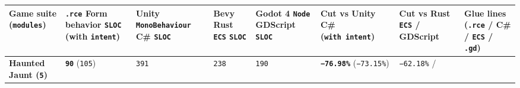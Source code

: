 \documentclass[10pt,letterpaper]{article}
\begin{document}
{\scriptsize\setlength{\tabcolsep}{2.4pt}\renewcommand{\arraystretch}{1.12}
\begin{longtable}[]{@{}
  >{\raggedright\arraybackslash}p{}
  >{\raggedleft\arraybackslash}p{}
  >{\raggedleft\arraybackslash}p{}
  >{\raggedleft\arraybackslash}p{}
  >{\raggedleft\arraybackslash}p{}
  >{\raggedleft\arraybackslash}p{}
  >{\raggedleft\arraybackslash}p{}
  >{\raggedleft\arraybackslash}p{}@{}}
\toprule\noalign{}
\begin{minipage}[b]{\linewidth}\raggedright
\textbf{Game suite (\texttt{modules})}
\end{minipage} & \begin{minipage}[b]{\linewidth}\raggedleft
\textbf{\texttt{.rce} Form behavior \texttt{SLOC} (with
\texttt{intent})}
\end{minipage} & \begin{minipage}[b]{\linewidth}\raggedleft
\textbf{Unity \texttt{MonoBehaviour} C\# \texttt{SLOC}}
\end{minipage} & \begin{minipage}[b]{\linewidth}\raggedleft
\textbf{Bevy Rust \texttt{ECS} \texttt{SLOC}}
\end{minipage} & \begin{minipage}[b]{\linewidth}\raggedleft
\textbf{Godot 4 \texttt{Node} GDScript \texttt{SLOC}}
\end{minipage} & \begin{minipage}[b]{\linewidth}\raggedleft
\textbf{Cut vs Unity C\# (\texttt{with\ intent})}
\end{minipage} & \begin{minipage}[b]{\linewidth}\raggedleft
\textbf{Cut vs Rust \texttt{ECS} / GDScript}
\end{minipage} & \begin{minipage}[b]{\linewidth}\raggedleft
\textbf{Glue lines (\texttt{.rce} / C\# / \texttt{ECS} / \texttt{.gd})}
\end{minipage} \\
\midrule\noalign{}
\endhead
\bottomrule\noalign{}
\endlastfoot
\textbf{Haunted Jaunt (\texttt{5})} & \textbf{\texttt{90}}
(\texttt{105}) & \texttt{391} & \texttt{238} & \texttt{190} &
\textbf{\texttt{−76.98\%}} (\texttt{−73.15\%}) & \texttt{−62.18\%} /

\end{longtable}}
\end{document}
